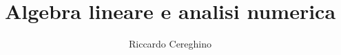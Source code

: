 \documentclass[12pt,twoside]{mitthesis}
\begin{document}
\newtheorem{alg}{Algoritmo}
\newtheorem{theo}{Teorema}
\newtheorem{defn}{Definizione}
\newtheorem{dimo}{Dimostrazione}
\newtheorem{coro}{Corollario}
\newtheorem{prop}{Proposizione}

\title{Algebra lineare e analisi numerica}

\author{Riccardo Cereghino}
\pagestyle{plain}



%
\end{document}
